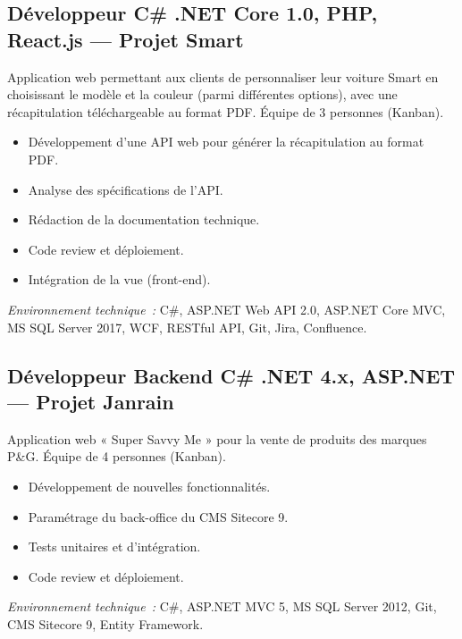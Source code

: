 \documentclass[10pt,a4paper]{article}
\begin{document}
\vspace{6pt}

\subsection*{Développeur C\# .NET Core 1.0, PHP, React.js --- Projet Smart}
\color{darkgray}
Application web permettant aux clients de personnaliser leur voiture Smart en choisissant le modèle et la couleur (parmi différentes options), avec une récapitulation téléchargeable au format PDF. Équipe de 3 personnes (Kanban).
\begin{itemize}
  \item Développement d'une API web pour générer la récapitulation au format PDF.
  \item Analyse des spécifications de l'API.
  \item Rédaction de la documentation technique.
  \item Code review et déploiement.
  \item Intégration de la vue (front-end).
\end{itemize}
\textit{Environnement technique~:} C\#, ASP.NET Web API 2.0, ASP.NET Core MVC, MS SQL Server 2017, WCF, RESTful API, Git, Jira, Confluence.

\vspace{6pt}

\subsection*{Développeur Backend C\# .NET 4.x, ASP.NET --- Projet Janrain}
\color{darkgray}
Application web « Super Savvy Me » pour la vente de produits des marques P\&G. Équipe de 4 personnes (Kanban).
\begin{itemize}
  \item Développement de nouvelles fonctionnalités.
  \item Paramétrage du back-office du CMS Sitecore 9.
  \item Tests unitaires et d'intégration.
  \item Code review et déploiement.
\end{itemize}
\textit{Environnement technique~:} C\#, ASP.NET MVC 5, MS SQL Server 2012, Git, CMS Sitecore 9, Entity Framework.

\vspace{6pt}
\end{document}
